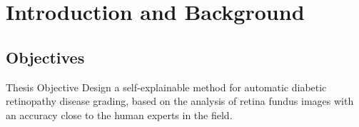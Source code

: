 \documentclass{beamer}
\begin{document}
\section{Introduction and Background}

\subsection{Objectives}

\begin{frame}{Thesis Objective}
\centering
\Large Design a self-explainable method for automatic diabetic retinopathy disease grading, based on the analysis of retina fundus images with an accuracy close to the human experts in the field.

\end{frame}







\end{document}
